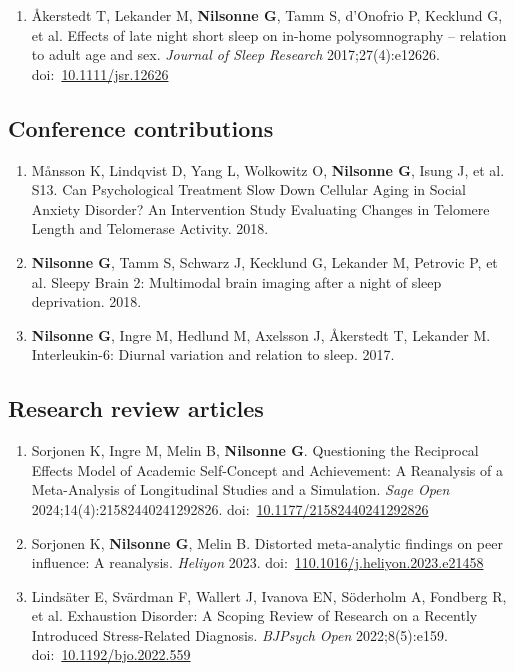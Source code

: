 \documentclass[11pt,a4paper]{article}
\begin{document}
\begin{enumerate}
\item Åkerstedt T, Lekander M, \textbf{Nilsonne G}, Tamm S, d'Onofrio P, Kecklund G, et al. Effects of late night short sleep on in-home polysomnography – relation to adult age and sex. \textit{Journal of Sleep Research} 2017;27(4):e12626. doi:~\href{https://doi.org/10.1111/jsr.12626}{10.1111/jsr.12626}

\end{enumerate}



\subsection*{Conference contributions}
\begin{enumerate}

\item Månsson K, Lindqvist D, Yang L, Wolkowitz O, \textbf{Nilsonne G}, Isung J, et al. S13. Can Psychological Treatment Slow Down Cellular Aging in Social Anxiety Disorder? An Intervention Study Evaluating Changes in Telomere Length and Telomerase Activity. 2018.

\item \textbf{Nilsonne G}, Tamm S, Schwarz J, Kecklund G, Lekander M, Petrovic P, et al. Sleepy Brain 2: Multimodal brain imaging after a night of sleep deprivation. 2018.

\item \textbf{Nilsonne G}, Ingre M, Hedlund M, Axelsson J, Åkerstedt T, Lekander M. Interleukin-6: Diurnal variation and relation to sleep. 2017.

\end{enumerate}



\subsection*{Research review articles}
\begin{enumerate}

\item Sorjonen K, Ingre M, Melin B, \textbf{Nilsonne G}. Questioning the Reciprocal Effects Model of Academic Self-Concept and Achievement: A Reanalysis of a Meta-Analysis of Longitudinal Studies and a Simulation. \textit{Sage Open} 2024;14(4):21582440241292826. doi:~\href{https://doi.org/10.1177/21582440241292826}{10.1177/21582440241292826}

\item Sorjonen K, \textbf{Nilsonne G}, Melin B. Distorted meta-analytic findings on peer influence: A reanalysis. \textit{Heliyon} 2023. doi:~\href{https://doi.org/110.1016/j.heliyon.2023.e21458}{110.1016/j.heliyon.2023.e21458}

\item Lindsäter E, Svärdman F, Wallert J, Ivanova EN, Söderholm A, Fondberg R, et al. Exhaustion Disorder: A Scoping Review of Research on a Recently Introduced Stress-Related Diagnosis. \textit{BJPsych Open} 2022;8(5):e159. doi:~\href{https://doi.org/10.1192/bjo.2022.559}{10.1192/bjo.2022.559}

\end{enumerate}
\end{document}
